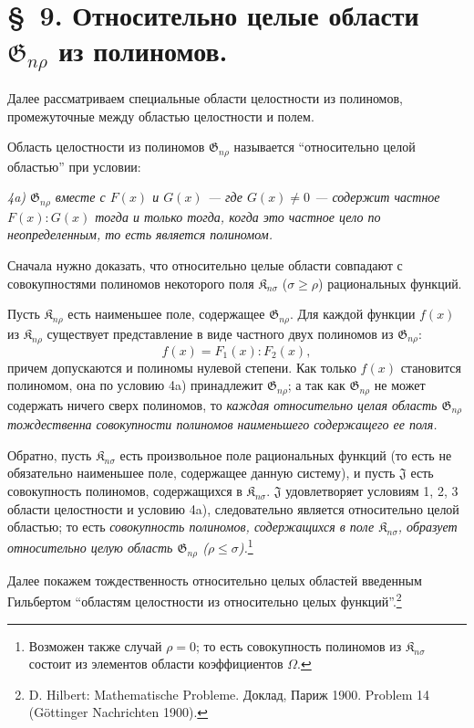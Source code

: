 \documentclass[11pt]{article}
\providecommand{\Kfield}{\mathfrak{K}}
\providecommand{\Jdom}{\mathfrak{J}}
\providecommand{\Gdom}{\mathfrak{G}}
\begin{document}
\section*{\S\ 9. Относительно целые области $\Gdom_{n\rho}$ из полиномов.}

Далее рассматриваем специальные области целостности из полиномов, промежуточные между областью целостности и полем.

Область целостности из полиномов $\Gdom_{n\rho}$ называется ``относительно целой областью'' при условии:

\emph{4a) $\Gdom_{n\rho}$ вместе с $F(x)$ и $G(x)$ --- где $G(x)\ne0$ --- содержит частное $F(x):G(x)$ тогда и только тогда, когда это частное цело по неопределенным, то есть является полиномом.}

Сначала нужно доказать, что относительно целые области совпадают с совокупностями полиномов некоторого поля $\Kfield_{n\sigma}$ ($\sigma\ge \rho$) рациональных функций.

Пусть $\Kfield_{n\rho}$ есть наименьшее поле, содержащее $\Gdom_{n\rho}$. Для каждой функции $f(x)$ из $\Kfield_{n\rho}$ существует представление в виде частного двух полиномов из $\Gdom_{n\rho}$:
\[
  f(x)=F_1(x):F_2(x),
\]
причем допускаются и полиномы нулевой степени. Как только $f(x)$ становится полиномом, она по условию 4a) принадлежит $\Gdom_{n\rho}$; а так как $\Gdom_{n\rho}$ не может содержать ничего сверх полиномов, то \emph{каждая относительно целая область $\Gdom_{n\rho}$ тождественна совокупности полиномов наименьшего содержащего ее поля.}

Обратно, пусть $\Kfield_{n\sigma}$ есть произвольное поле рациональных функций (то есть не обязательно наименьшее поле, содержащее данную систему), и пусть $\Jdom$ есть совокупность полиномов, содержащихся в $\Kfield_{n\sigma}$. $\Jdom$ удовлетворяет условиям 1, 2, 3 области целостности и условию 4a), следовательно является относительно целой областью; то есть \emph{совокупность полиномов, содержащихся в поле $\Kfield_{n\sigma}$, образует относительно целую область $\Gdom_{n\rho}$ ($\rho\le\sigma$).}\footnote{Возможен также случай $\rho=0$; то есть совокупность полиномов из $\Kfield_{n\sigma}$ состоит из элементов области коэффициентов $\Omega$.}

Далее покажем тождественность относительно целых областей введенным Гильбертом ``областям целостности из относительно целых функций''.\footnote{D. Hilbert: Mathematische Probleme. Доклад, Париж 1900. Problem 14 (Göttinger Nachrichten 1900).}
\end{document}
